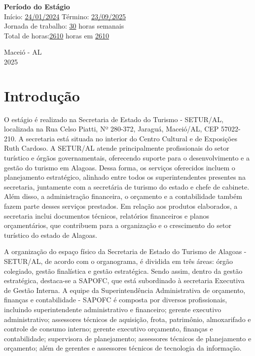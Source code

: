 \documentclass[12pt,a4paper]{article}
\begin{document}
	\vspace{0.5cm}
	\noindent \textbf{Período do Estágio} \\
	Início: \underline{24/01/2024\hspace{0,0cm}} \quad Término: \underline{23/09/2025\hspace{0,0cm}} \\
	Jornada de trabalho: \underline{30\hspace{0.0cm}} horas semanais \\
	Total de horas:\underline{2610\hspace{0,0cm}} horas em  \underline{2610\hspace{0,0cm}} \\
	
	\vfill
	\begin{flushright}
		\centering Maceió - AL \\
		2025
	\end{flushright}
	
	\newpage
	
	\section{Introdução}
	
	\hspace*{1.5cm}O estágio é realizado na Secretaria de Estado do Turismo - SETUR/AL, localizada na Rua Celso Piatti, Nº 280-372, Jaraguá, Maceió/AL, CEP 57022-210. A secretaria está situada no interior do Centro Cultural e de Exposições Ruth Cardoso. A SETUR/AL atende principalmente profissionais do setor turístico e órgãos governamentais, oferecendo suporte para o desenvolvimento e a gestão do turismo em Alagoas. Dessa forma, os serviços oferecidos incluem o planejamento estratégico, alinhado entre todos os superintendentes presentes na secretaria, juntamente com a secretária de turismo do estado e chefe de cabinete. Além disso, a administração financeira, o orçamento e a contabilidade também fazem parte desses serviços prestados. Em relação aos produtos elaborados, a secretaria inclui documentos técnicos, relatórios financeiros e planos orçamentários, que contribuem para a organização e o crescimento do setor turístico do estado de Alagoas.
	
	A organização do espaço físico da Secretaria de Estado do Turismo de Alagoas - SETUR/AL, de acordo com o organograma, é dividida em três áreas: órgão colegiado, gestão finalística e gestão estratégica. Sendo assim, dentro da gestão estratégica, destaca-se a SAPOFC, que está subordinado à secretaria Executiva de Gestão Interna.
	A equipe da Superintendência Administrativa de orçamento, finanças e contabilidade - SAPOFC é composta por diversos profissionais, incluindo superintendente administrativo e financeiro; gerente executivo administrativo; assessores técnicos de aquisição, frota, patrimônio, almoxarifado e controle de consumo interno; gerente executivo orçamento, finanças e contabilidade; supervisora de planejamento; assessores técnicos de planejamento e orçamento; além de gerentes e assessores técnicos de tecnologia da informação. 
	
\end{document}

